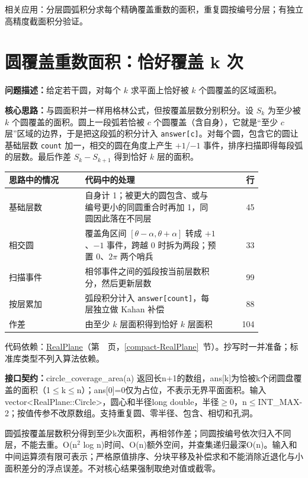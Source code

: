 \newpage

\noindent 相关应用：分层圆弧积分求每个精确覆盖重数的面积，重复圆按编号分层；有独立高精度截面积分验证。

\section{圆覆盖重数面积：恰好覆盖 k 次}\label{compact-circle_coverage_area}

\noindent\textbf{问题描述：}\allowbreak 给定若干圆，对每个 $k$ 求平面上恰好被 $k$ 个圆覆盖的区域面积。

\textbf{核心思路：}\allowbreak 与圆面积并一样用格林公式，但按覆盖层数分别积分。设 $S_k$ 为至少被 $k$ 个圆覆盖的面积。圆上一段弧若恰被 $c$ 个圆覆盖（含自身），它就是“至少 $c$ 层”区域的边界，于是把这段弧的积分计入 \texttt{answer[c]}。对每个圆，包含它的圆让基础层数 \texttt{count} 加一，相交的圆在角度上产生 $+1$/$-1$ 事件，排序扫描即得每段弧的层数。最后作差 $S_k-S_{k+1}$ 得到恰好 $k$ 层的面积。

\begin{center}\small
\begin{tabular}{@{}p{0.30\linewidth}p{0.55\linewidth}r@{}}
\toprule
思路中的情况 & 代码中的处理 & 行\\
\midrule
基础层数 & 自身计 1；被更大的圆包含、或与编号更小的同圆重合时再加 1，同圆因此落在不同层 & 45\\
相交圆 & 覆盖角区间 $[\theta-\alpha,\theta+\alpha]$ 转成 $+1$、$-1$ 事件，跨越 $0$ 时拆为两段；预置 $0$、$2\pi$ 两个哨兵 & 33\\
扫描事件 & 相邻事件之间的弧段按当前层数积分，然后更新层数 & 99\\
按层累加 & 弧段积分计入 \texttt{answer[count]}，每层独立做 Kahan 补偿 & 88\\
作差 & 由至少 $k$ 层面积得到恰好 $k$ 层面积 & 104\\
\bottomrule
\end{tabular}
\end{center}

代码依赖：\hyperref[compact-RealPlane]{RealPlane}（第~\pageref{compact-RealPlane}~页，\ref{compact-RealPlane}~节）。抄写时一并准备；标准库类型不列入算法依赖。

{\sloppy{}\noindent\textbf{接口契约：}circle\_coverage\_area(a) 返回长n+1的数组，ans[k]为恰被k个闭圆盘覆盖的面积（1$\le$k$\le$n）；ans[0]=0仅为占位，不表示无界平面面积。输入vector<RealPlane::Circle>，圆心和半径long double，半径$\ge$0，n$\le$INT\_MAX-2；按值传参不改原数组。支持重复圆、零半径、包含、相切和孔洞。

圆弧按覆盖层数积分得到至少k次面积，再相邻作差；同圆按编号依次归入不同层，不能去重。O(n$^{2}$ log n)时间、O(n)额外空间，并查集递归最深O(n)。输入和中间运算须有限可表示；严格原值排序、分块平移及补偿求和不能消除近退化与小面积差分的浮点误差。不对核心结果强制取绝对值或截零。\par}

